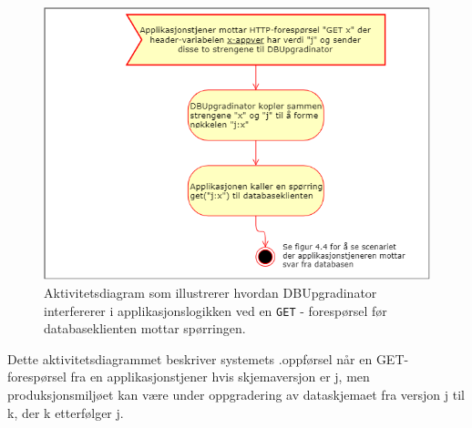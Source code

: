 \begin{figure}[!ht]
    \centering
    \includegraphics[scale=0.6]{fig/dbupgradinator-prosess-1.png}
    \caption{Aktivitetsdiagram som illustrerer hvordan DBUpgradinator interfererer i applikasjonslogikken ved en \texttt{GET} - forespørsel før databaseklienten mottar spørringen.}
    \label{fig7}
\end{figure}

Dette aktivitetsdiagrammet beskriver systemets .oppførsel når en GET-forespørsel fra en applikasjonstjener hvis skjemaversjon er j, men produksjonsmiljøet kan være under oppgradering av dataskjemaet fra versjon j til k, der k etterfølger j.

\newpage

